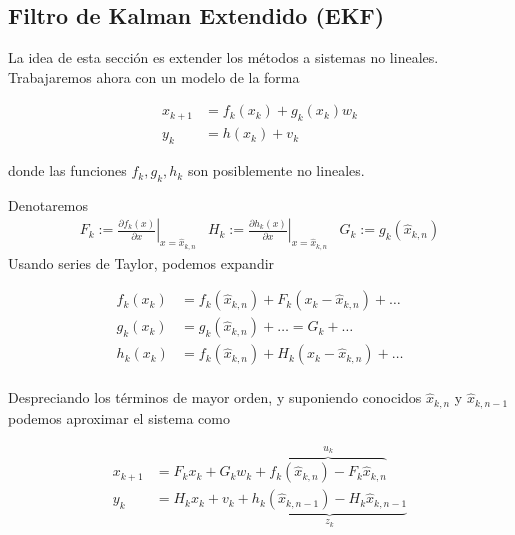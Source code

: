 

\subsection{Filtro de Kalman Extendido (EKF)}\label{filtro-extendido}


La idea de esta sección es extender los métodos a sistemas no lineales. Trabajaremos ahora con un modelo de la forma 

\begin{equation}
\begin{aligned}
x_{k+1} &= f_k(x_k) + g_k(x_k) w_k \\
y_{k} &= h(x_k) + v_k
\end{aligned}
\end{equation}

donde las funciones \(f_k, g_k, h_k\) son posiblemente no lineales. 

Denotaremos 
\begin{equation}
\begin{aligned}
F_k := \left. \frac{\partial f_k(x)}{\partial x} \right|_{x = \hat{x}_{k,n}} & H_k := \left. \frac{\partial h_k(x)}{\partial x} \right|_{x = \hat{x}_{k,n}} & G_k := g_k(\hat{x}_{k,n})
\end{aligned}
\end{equation}
Usando series de Taylor, podemos expandir 

\[
\begin{aligned}
f_k(x_k) &= f_k(\hat{x}_{k,n}) + F_k(x_k - \hat{x}_{k,n}) + \dots \\
g_k(x_k) &= g_k(\hat{x}_{k,n}) + \dots = G_k + \dots \\
h_k(x_k) &= f_k(\hat{x}_{k,n}) + H_k(x_k - \hat{x}_{k,n}) + \dots \\
\end{aligned}
\]

Despreciando los términos de mayor orden, y suponiendo conocidos \(\hat{x}_{k,n}\) y \(\hat{x}_{k,n-1}\) podemos aproximar el sistema como 

\begin{equation}
\begin{aligned}
x_{k+1} &= F_k x_k + G_k w_k + \overbrace{f_k(\hat{x}_{k,n}) - F_k \hat{x}_{k,n}}^{u_k} \\
y_{k} &= H_k x_k + v_k + \underbrace{h_k(\hat{x}_{k,n-1}) - H_k \hat{x}_{k,n-1}}_{z_k}
\end{aligned}
\end{equation}


